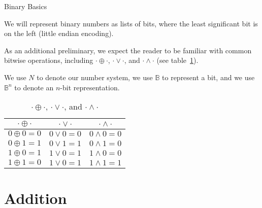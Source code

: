 \documentclass[aspectratio=169]{beamer}
\begin{document}
\begin{frame}{Binary Basics}

We will represent binary numbers as lists of bits, where the least significant bit is on the left (little endian encoding).

As an additional preliminary, we expect the reader to be familiar with common bitwise operations, including $\cdot \oplus \cdot$, $\cdot \lor \cdot$, and $\cdot \land \cdot$ (see table~\ref{table:bitops}).
\begin{notn}
  We use $N$ to denote our number system, we use $\mathbb{B}$ to represent a bit,  and we use $\mathbb{B}^{n}$ to denote an $n$-bit representation.
\end{notn}
\begin{table}[h]
\centering
\begin{tabular}{||c c c||}
 \hline
 $\cdot \oplus \cdot$ & $\cdot \lor \cdot$ & $\cdot \land \cdot$  \\ [0.5ex]
 \hline\hline
 $0 \oplus 0 = 0$ & $0 \lor 0 = 0$ & $0 \land 0 = 0$ \\
 $0 \oplus 1 = 1$ & $0 \lor 1 = 1$ & $0 \land 1 = 0$ \\
 $1 \oplus 0 = 1$ & $1 \lor 0 = 1$ & $1 \land 0 = 0$ \\
 $1 \oplus 1 = 0$ & $1 \lor 0 = 1$ & $1 \land 1 = 1$ \\
 \hline
\end{tabular}
\caption{$\cdot \oplus \cdot$, $\cdot \lor \cdot$, and $\cdot \land \cdot$}
\label{table:bitops}
\end{table}



\end{frame}

\section{Addition}
\end{document}
